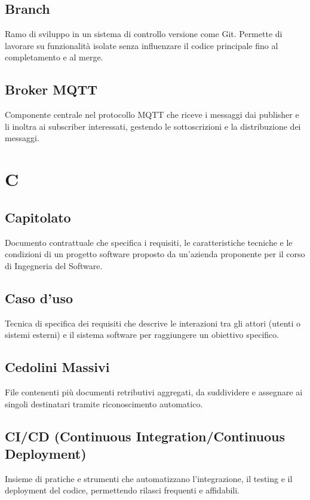 \documentclass[a4paper,11pt]{article}
\begin{document}
\subsection{Branch}
Ramo di sviluppo in un sistema di controllo versione come Git. Permette di lavorare su funzionalità isolate senza influenzare il codice principale fino al completamento e al merge.

\subsection{Broker MQTT}
Componente centrale nel protocollo MQTT che riceve i messaggi dai publisher e li inoltra ai subscriber interessati, gestendo le sottoscrizioni e la distribuzione dei messaggi.

\newpage
\section{C}

\subsection{Capitolato}
Documento contrattuale che specifica i requisiti, le caratteristiche tecniche e le condizioni di un progetto software proposto da un'azienda proponente per il corso di Ingegneria del Software.

\subsection{Caso d'uso}
Tecnica di specifica dei requisiti che descrive le interazioni tra gli attori (utenti o sistemi esterni) e il sistema software per raggiungere un obiettivo specifico.

\subsection{Cedolini Massivi}
File contenenti più documenti retributivi aggregati, da suddividere e assegnare ai singoli destinatari tramite riconoscimento automatico.

\subsection{CI/CD (Continuous Integration/Continuous Deployment)}
Insieme di pratiche e strumenti che automatizzano l'integrazione, il testing e il deployment del codice, permettendo rilasci frequenti e affidabili.
\end{document}
